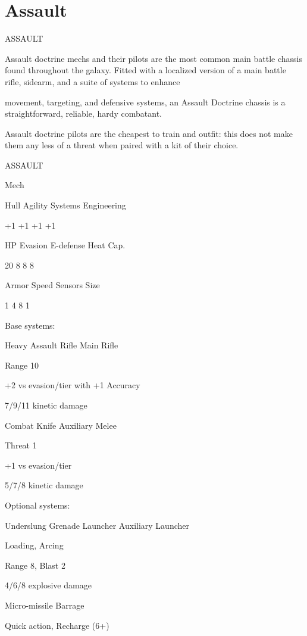 \section{Assault}
                                                ASSAULT

Assault doctrine mechs and their pilots are the most common main battle chassis found throughout the
galaxy. Fitted with a localized version of a main battle rifle, sidearm, and a suite of systems to enhance

movement, targeting, and defensive systems, an Assault Doctrine chassis is a straightforward, reliable,
hardy combatant.

Assault doctrine pilots are the cheapest to train and outfit: this does not make them any less of a threat
when paired with a kit of their choice.

       ASSAULT

       Mech

       Hull       Agility      Systems       Engineering

       +1         +1           +1            +1

       HP         Evasion      E-defense     Heat Cap.

       20         8            8             8

       Armor      Speed        Sensors       Size

       1          4            8             1

Base systems:

Heavy Assault Rifle
Main Rifle

Range 10

+2 vs evasion/tier with +1 Accuracy

7/9/11 kinetic damage


Combat Knife
Auxiliary Melee

Threat 1

+1 vs evasion/tier

5/7/8 kinetic damage





Optional systems:

Underslung Grenade Launcher
Auxiliary Launcher

Loading, Arcing

Range 8, Blast 2

4/6/8 explosive damage


Micro-missile Barrage

Quick action, Recharge (6+)

